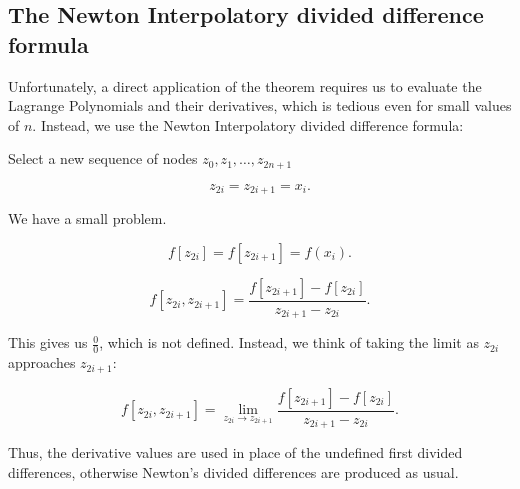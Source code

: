 \subsection{The Newton Interpolatory divided difference formula}

Unfortunately, a direct application of the theorem requires us to evaluate the
Lagrange Polynomials and their derivatives, which is tedious even for small
values of $n$. Instead, we use the Newton Interpolatory divided difference
formula:

Select a new sequence of nodes $z_0, z_1, \dots, z_{2n+1}$ 

\[
  z_{2i} = z_{2i+1} = x_i
.\]

We have a small problem. 

\[
  f[z_{2i}] = f[z_{2i+1}] = f(x_i)
.\]

\[
  f[z_{2i}, z_{2i+1}] = \frac{f[z_{2i+1}] - f[z_{2i}]}{z_{2i+1} - z_{2i}}
.\]

This gives us $\frac{0}{0}$, which is not defined. Instead, we think of taking
the limit as $z_{2i}$ approaches $z_{2i+1}$:

\[
  f[z_{2i}, z_{2i+1}] = \lim_{z_{2i} \to z_{2i+1}} \frac{f[z_{2i+1}] - f[z_{2i}]}{z_{2i+1} - z_{2i}}
.\]


Thus, the derivative values are used in place of the undefined first divided
differences, otherwise Newton's divided differences are produced as usual.

